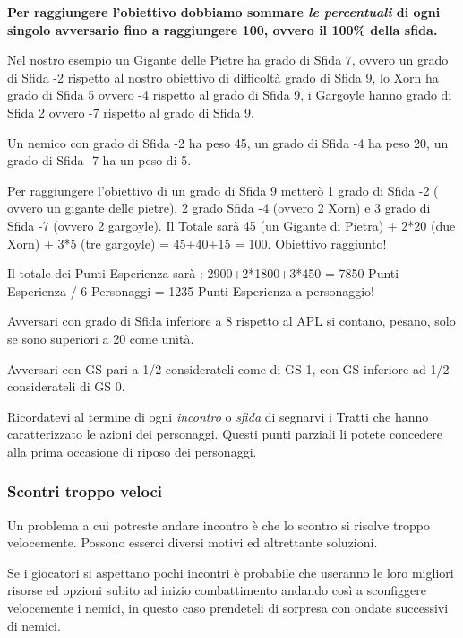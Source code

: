 \begin{multicols}{2}
\textbf{Per raggiungere l'obiettivo dobbiamo sommare \emph{le percentuali} di ogni singolo avversario fino a raggiungere 100, ovvero il 100\% della sfida.}

Nel nostro esempio un Gigante delle Pietre ha grado di Sfida 7, ovvero un grado di Sfida -2 rispetto al nostro obiettivo di difficoltà grado di Sfida 9, lo Xorn ha grado di Sfida 5 ovvero -4 rispetto al grado di Sfida 9, i Gargoyle hanno grado di Sfida 2 ovvero -7 rispetto al grado di Sfida 9.

Un nemico con grado di Sfida -2 ha peso 45, un grado di Sfida -4 ha peso 20, un grado di Sfida -7 ha un peso di 5.

Per raggiungere l'obiettivo di un grado di Sfida 9 metterò 1 grado di Sfida -2 ( ovvero un gigante delle pietre), 2 grado Sfida -4 (ovvero 2 Xorn) e 3 grado di Sfida -7 (ovvero 2 gargoyle). Il Totale sarà 45 (un Gigante di Pietra) + 2*20 (due Xorn) + 3*5 (tre gargoyle) = 45+40+15 = 100. Obiettivo raggiunto!

Il totale dei Punti Esperienza sarà : 2900+2*1800+3*450 = 7850 Punti Esperienza / 6 Personaggi = 1235 Punti Esperienza a personaggio!

Avversari con grado di Sfida inferiore a 8 rispetto al APL si contano, pesano, solo se sono superiori a 20 come unità.

Avversari con GS pari a 1/2 considerateli come di GS 1, con GS inferiore ad 1/2 considerateli di GS 0.

\begin{changemargin}{0.3cm}{0.3cm}\begin{narratore}
Ricordatevi al termine di ogni \emph{incontro} o \emph{sfida} di segnarvi i Tratti che hanno caratterizzato le azioni dei personaggi. Questi punti parziali li potete concedere alla prima occasione di riposo dei personaggi.
\end{narratore}\end{changemargin}

\subsubsection{Scontri troppo veloci}

Un problema a cui potreste andare incontro è che lo scontro si risolve troppo velocemente. Possono esserci diversi motivi ed altrettante soluzioni.

Se i giocatori si aspettano pochi incontri è probabile che useranno le loro migliori risorse ed opzioni subito ad inizio combattimento andando così a sconfiggere velocemente i nemici, in questo caso prendeteli di sorpresa con ondate successivi di nemici.


\end{multicols}
